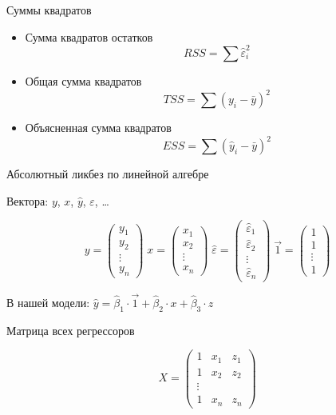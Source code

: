 \documentclass[ignorenonframetext,]{beamer}
\begin{document}
\begin{frame}{Суммы квадратов}

\begin{itemize}
\item
  Сумма квадратов остатков \[
  RSS=\sum \hat{\varepsilon}_i^2
  \]
\item
  Общая сумма квадратов \[
  TSS=\sum (y_i-\bar{y})^2
  \]
\item
  Объясненная сумма квадратов \[
  ESS=\sum (\hat{y}_i-\bar{y})^2
  \]
\end{itemize}

\end{frame}

\begin{frame}{Абсолютный ликбез по линейной алгебре}

Вектора: \(y\), \(x\), \(\hat{y}\), \(\varepsilon\), \ldots

\[
y=\begin{pmatrix}
y_1 \\
y_2 \\
\vdots \\
y_n
\end{pmatrix}\;
x=\begin{pmatrix}
x_1 \\
x_2 \\
\vdots \\
x_n
\end{pmatrix}\;
\hat{\varepsilon}=\begin{pmatrix}
\hat{\varepsilon}_1 \\
\hat{\varepsilon}_2 \\
\vdots \\
\hat{\varepsilon}_n
\end{pmatrix}\;
\vec{1}=\begin{pmatrix}
1 \\
1 \\
\vdots \\
1
\end{pmatrix}
\]

В нашей модели:
\(\hat{y}=\hat{\beta}_1 \cdot \vec{1}+\hat{\beta}_2 \cdot x +\hat{\beta}_3 \cdot z\)

\end{frame}

\begin{frame}{Матрица всех регрессоров}

\[
X=\begin{pmatrix}
1 & x_1 & z_1 \\
1 & x_2 & z_2 \\
\vdots \\
1 & x_n & z_n 
\end{pmatrix}
\]

\end{frame}
\end{document}
